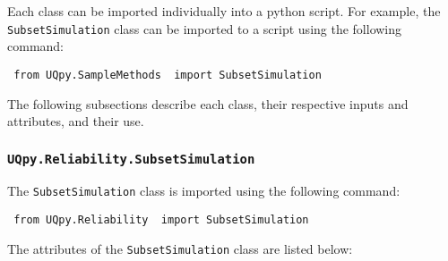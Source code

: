 \documentclass[./UsersGuide.tex]{subfiles}
\begin{document}
\noindent
Each class can be imported individually into a python script. For example, the \texttt{SubsetSimulation} class can be imported to a script using the following command:

\vspace{4mm}
\texttt{{\color{blue} from} \texttt{UQpy.SampleMethods} {\color{blue} import} SubsetSimulation}
\vspace{4mm}

\noindent
The following subsections describe each class, their respective inputs and attributes, and their use.


\subsubsection{\texttt{UQpy.Reliability.SubsetSimulation}}


The \texttt{SubsetSimulation} class is imported using the following command:

\vspace{4mm}
\texttt{{\color{blue} from} \texttt{UQpy.Reliability} {\color{blue} import} SubsetSimulation}
\vspace{4mm}

\noindent
The attributes of the \texttt{SubsetSimulation} class are listed below:
\end{document}
